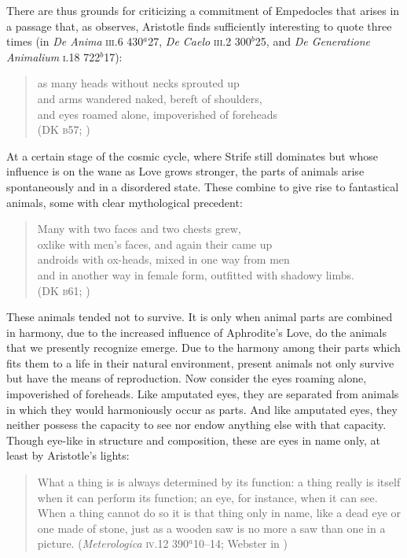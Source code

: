 There are thus grounds for criticizing a commitment of Empedocles that arises in a passage that, as \citet[211]{Wright:1981zr} observes, Aristotle finds sufficiently interesting to quote three times (in \emph{De Anima} \textsc{iii}.6 430\( ^{a} \)27, \emph{De Caelo} \textsc{iii}.2 300\( ^{b} \)25, and \emph{De Generatione Animalium} \textsc{i}.18 722\( ^{b} \)17):
\begin{verse}
	as many heads without necks sprouted up\\
	and arms wandered naked, bereft of shoulders,\\
	and eyes roamed alone, impoverished of foreheads\\
	(DK \textsc{b}57; \citealt[64 245]{Inwood:2001ve})
\end{verse}
At a certain stage of the cosmic cycle, where Strife still dominates but whose influence is on the wane as Love grows stronger, the parts of animals arise spontaneously and in a disordered state. These combine to give rise to fantastical animals, some with clear mythological precedent:
\begin{verse}
	Many with two faces and two chests grew,\\
	oxlike with men's faces, and again their came up\\
	androids with ox-heads, mixed in one way from men\\
	and in another way in female form, outfitted with shadowy limbs.\\
	(DK \textsc{b}61; \citealt[66 247]{Inwood:2001ve})
\end{verse}
These animals tended not to survive. It is only when animal parts are combined in harmony, due to the increased influence of Aphrodite's Love, do the animals that we presently recognize emerge. Due to the harmony among their parts which fits them to a life in their natural environment, present animals not only survive but have the means of reproduction. Now consider the eyes roaming alone, impoverished of foreheads. Like amputated eyes, they are separated from animals in which they would harmoniously occur as parts. And like amputated eyes, they neither possess the capacity to see nor endow anything else with that capacity. Though eye-like in structure and composition, these are eyes in name only, at least by Aristotle's lights:
\begin{quote}
	What a thing is is always determined by its function: a thing really is itself when it can perform its function; an eye, for instance, when it can see. When a thing cannot do so it is that thing only in name, like a dead eye or one made of stone, just as a wooden saw is no more a saw than one in a picture. (\emph{Meterologica} \textsc{iv}.12 390\( ^{a} \)10--14; Webster in \citealt[86]{Barnes:1984uq})
\end{quote}

